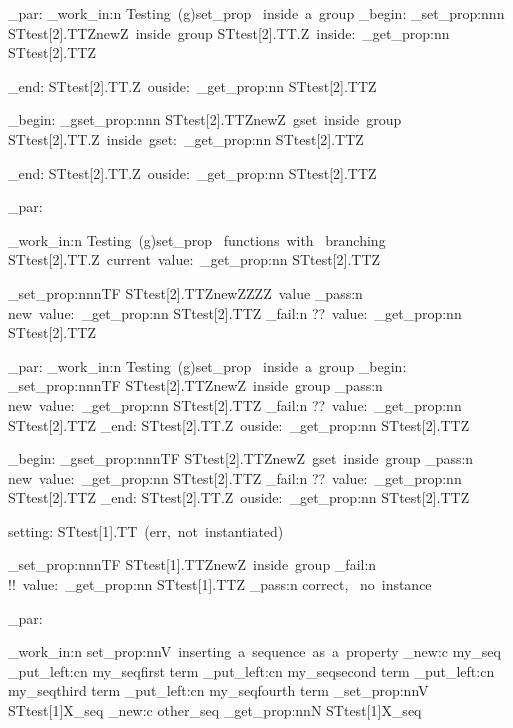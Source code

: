 \documentclass{article}
\begin{document}
\sttests_par:
\sttests_work_in:n {Testing~(g)set_prop ~inside~a~group}
\group_begin:
  \starray_set_prop:nnn {STtest[2].TT}{Z}{newZ~inside~group}
  STtest[2].TT.Z~inside:~\starray_get_prop:nn {STtest[2].TT}{Z}\par
\group_end:
  STtest[2].TT.Z~ouside:~\starray_get_prop:nn {STtest[2].TT}{Z}\par

\group_begin:
  \starray_gset_prop:nnn {STtest[2].TT}{Z}{newZ~gset~inside~group}
  STtest[2].TT.Z~inside~gset:~\starray_get_prop:nn {STtest[2].TT}{Z}\par
\group_end:
  STtest[2].TT.Z~ouside:~\starray_get_prop:nn {STtest[2].TT}{Z}\par

\sttests_par:

\sttests_work_in:n {Testing~(g)set_prop ~functions~with ~branching}
STtest[2].TT.Z~current~value:~\starray_get_prop:nn {STtest[2].TT}{Z}\par

\starray_set_prop:nnnTF {STtest[2].TT}{Z}{newZZZZ~value}
  {\sttests_pass:n {new~value:~\starray_get_prop:nn {STtest[2].TT}{Z}}}
  {\sttests_fail:n {??~value:~\starray_get_prop:nn {STtest[2].TT}{Z}}}

\sttests_par:
\sttests_work_in:n {Testing~(g)set_prop ~inside~a~group}
\group_begin:
  \starray_set_prop:nnnTF {STtest[2].TT}{Z}{newZ~inside~group}
    {\sttests_pass:n {new~value:~\starray_get_prop:nn {STtest[2].TT}{Z}}}
    {\sttests_fail:n {??~value:~\starray_get_prop:nn {STtest[2].TT}{Z}}}
\group_end:
  STtest[2].TT.Z~ouside:~\starray_get_prop:nn {STtest[2].TT}{Z}\par

\group_begin:
  \starray_gset_prop:nnnTF {STtest[2].TT}{Z}{newZ~gset~inside~group}
    {\sttests_pass:n {new~value:~\starray_get_prop:nn {STtest[2].TT}{Z}}}
    {\sttests_fail:n {??~value:~\starray_get_prop:nn {STtest[2].TT}{Z}}}
\group_end:
  STtest[2].TT.Z~ouside:~\starray_get_prop:nn {STtest[2].TT}{Z}\par

setting: STtest[1].TT~(err,~not~instantiated)\par
  \starray_set_prop:nnnTF {STtest[1].TT}{Z}{newZ~inside~group}
    {\sttests_fail:n {!!~value:~\starray_get_prop:nn {STtest[1].TT}{Z}}}
    {\sttests_pass:n {correct, ~no~instance}}


\sttests_par:

\sttests_work_in:n {set_prop:nnV~inserting~a~sequence~as~a~property}
        \seq_new:c {my_seq}
        \seq_put_left:cn {my_seq}{first term}
        \seq_put_left:cn {my_seq}{second term}
        \seq_put_left:cn {my_seq}{third term}
        \seq_put_left:cn {my_seq}{fourth term}
        \starray_set_prop:nnV {STtest[1]}{X}{\my_seq}
        \seq_new:c {other_seq}
        \starray_get_prop:nnN {STtest[1]}{X}\other_seq
\end{document}
